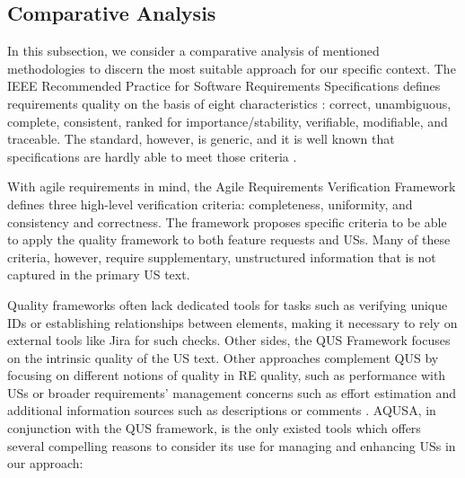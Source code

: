 \subsection{Comparative Analysis} \label{usq_5}
In this subsection, we consider a comparative analysis of mentioned methodologies to discern the most suitable approach for our specific context.
The IEEE Recommended Practice for Software Requirements Specifications defines requirements quality on the basis of eight characteristics \cite{doe2011recommended}: correct, unambiguous, complete, consistent, ranked for importance/stability, verifiable, modifiable, and traceable. The standard, however, is generic, and it is well known that specifications are hardly able to meet those criteria \cite{glinz2000improving}. 

With agile requirements in mind, the Agile Requirements Verification Framework \cite{heck2014quality} defines three high-level verification criteria: completeness, uniformity, and consistency and correctness. The framework proposes specific criteria to be able to apply the quality framework to both feature requests and USs. Many of these criteria, however, require supplementary, unstructured information that is not captured in the primary US text. 

Quality frameworks often lack dedicated tools for tasks such as verifying unique IDs or establishing relationships between elements, making it necessary to rely on external tools like Jira for such checks.
Other sides, the QUS Framework focuses on the intrinsic quality of the US text. Other approaches complement QUS by focusing on different notions of quality in RE quality, such as performance with USs \cite{lombriser2016gamified} or broader requirements' management concerns such as effort estimation and additional information sources such as descriptions or comments \cite{heck2014quality}. 
AQUSA, in conjunction with the QUS framework, is the only existed tools which offers several compelling reasons to consider its use for managing and enhancing USs in our approach: 

